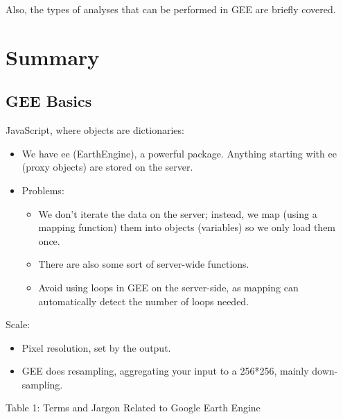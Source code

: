 \documentclass[
  letterpaper,
  DIV=11,
  numbers=noendperiod]{scrreprt}
\providecommand{\tightlist}{%
  \setlength{\itemsep}{0pt}\setlength{\parskip}{0pt}}\usepackage{longtable,booktabs,array}
\begin{document}
Also, the types of analyses that can be performed in GEE are briefly
covered.

\hypertarget{summary-3}{%
\section{Summary}\label{summary-3}}

\hypertarget{gee-basics}{%
\subsection{GEE Basics}\label{gee-basics}}

JavaScript, where objects are dictionaries:

\begin{itemize}
\tightlist
\item
  We have ee (EarthEngine), a powerful package. Anything starting with
  ee (proxy objects) are stored on the server.
\item
  Problems:

  \begin{itemize}
  \tightlist
  \item
    We don't iterate the data on the server; instead, we map (using a
    mapping function) them into objects (variables) so we only load them
    once.
  \item
    There are also some sort of server-wide functions.
  \item
    Avoid using loops in GEE on the server-side, as mapping can
    automatically detect the number of loops needed.
  \end{itemize}
\end{itemize}

Scale:

\begin{itemize}
\tightlist
\item
  Pixel resolution, set by the output.
\item
  GEE does resampling, aggregating your input to a 256*256, mainly
  down-sampling.
\end{itemize}

Table 1: Terms and Jargon Related to Google Earth Engine
\end{document}
